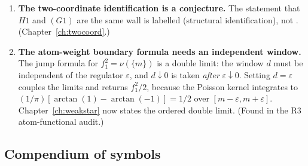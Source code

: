 \begin{enumerate}
  finite-moment match is blind to the atom; the two-coordinate picture records this as the
  weak-$*$ theorem. (Chapter~\ref{ch:weakstar}.)
\item \textbf{The two-coordinate identification is a conjecture.} The statement that $H1$ and
  $(G1)$ are the same wall is labelled \LC{} (structural identification), not \LT.
  (Chapter~\ref{ch:twocoord}.)
\item \textbf{The atom-weight boundary formula needs an independent window.} The jump formula
  for $f_1^2=\nu(\{m\})$ is a double limit: the window $d$ must be independent of the regulator
  $\varepsilon$, and $d\downarrow0$ is taken \emph{after} $\varepsilon\downarrow0$. Setting
  $d=\varepsilon$ couples the limits and returns $f_1^2/2$, because the Poisson kernel integrates
  to $(1/\pi)[\arctan(1)-\arctan(-1)]=1/2$ over $[m-\varepsilon,m+\varepsilon]$. Chapter~\ref{ch:weakstar}
  now states the ordered double limit. (Found in the R3 atom-functional audit.)
\end{enumerate}

\subsection{Compendium of symbols}

